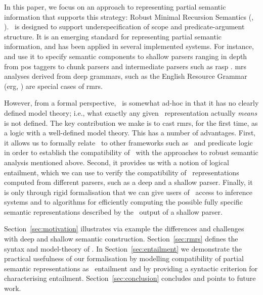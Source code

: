 In this paper, we focus on an approach to representing partial
semantic information that supports this strategy: Robust Minimal
Recursion Semantics (\rmrs, \cite{copestake:2007a,copestake:2007b}).
\rmrs\ is 
designed to
support underspecification of scope and predicate-argument structure.
It is an emerging standard for representing partial
semantic information, and has been applied in several implemented
systems.  For instance,  and
 use it to specify semantic components to shallow
parsers ranging in depth from {\sc pos} taggers to chunk parsers and
intermediate parsers such as {\sc rasp} \cite{briscoe:etal:2006}.
{\sc mrs} analyses \cite{copestake:etal:2005}
derived from deep grammars, such as the English
Resource Grammar ({\sc erg}, \cite{copestake:flickinger:2000}) are
special cases of {\sc rmrs}.

However, from a formal perspective, \rmrs\ is somewhat ad-hoc in that
it has no clearly defined model theory; i.e., what exactly any given
\rmrs\ representation actually \emph{means} is not defined.  The key
contribution we make is to cast {\sc rmrs}, for the first time, as a
logic with a well-defined model theory.  This has a number of
advantages.  First, it allows us to formally relate \rmrs\ to other
frameworks such as \mrs\ and predicate logic in order to establish the
compatibility of \rmrs\ with the approaches to robust semantic
analysis mentioned above.  
Second, it provides us with a notion of logical
entailment, which we can use to verify the compatibility of \rmrs\ 
representations computed from different parsers, such as a deep and a
shallow parser.  Finally, it is only through rigid formalisation that
we can give users of \rmrs\ access to inference systems and to
algorithms for efficiently computing the possible fully specific
semantic representations described by the \rmrs\ output of a shallow
parser.

Section~\ref{sec:motivation} illustrates via example the differences
and challenges with deep and shallow semantic construction.
Section~\ref{sec:rmrs} defines the syntax and model-theory of \rmrs.
In Section~\ref{sec:entailment} we demonstrate the practical
usefulness of our formalisation by modelling compatibility of partial
semantic representations as \rmrs\ entailment and by providing a
syntactic criterion for characterising entailment.
Section~\ref{sec:conclusion} concludes and points to future work.


